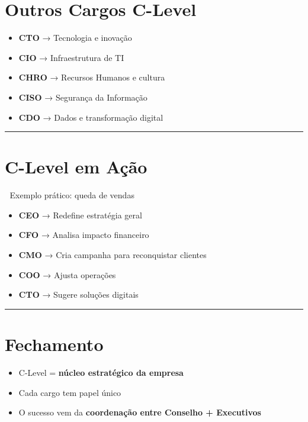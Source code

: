 \documentclass[
]{book}
\providecommand{\tightlist}{%
  \setlength{\itemsep}{0pt}\setlength{\parskip}{0pt}}
\begin{document}
\section{Outros Cargos C-Level}\label{outros-cargos-c-level}

\begin{itemize}
\tightlist
\item
  \textbf{CTO} → Tecnologia e inovação
\item
  \textbf{CIO} → Infraestrutura de TI
\item
  \textbf{CHRO} → Recursos Humanos e cultura
\item
  \textbf{CISO} → Segurança da Informação
\item
  \textbf{CDO} → Dados e transformação digital
\end{itemize}

\begin{center}\rule{0.5\linewidth}{0.5pt}\end{center}

\section{C-Level em Ação}\label{c-level-em-auxe7uxe3o}

📌 Exemplo prático: queda de vendas

\begin{itemize}
\tightlist
\item
  \textbf{CEO} → Redefine estratégia geral\\
\item
  \textbf{CFO} → Analisa impacto financeiro\\
\item
  \textbf{CMO} → Cria campanha para reconquistar clientes\\
\item
  \textbf{COO} → Ajusta operações\\
\item
  \textbf{CTO} → Sugere soluções digitais
\end{itemize}

\begin{center}\rule{0.5\linewidth}{0.5pt}\end{center}

\section{Fechamento}\label{fechamento}

\begin{itemize}
\tightlist
\item
  C-Level = \textbf{núcleo estratégico da empresa}\\
\item
  Cada cargo tem papel único\\
\item
  O sucesso vem da \textbf{coordenação entre Conselho + Executivos}
\end{itemize}
\end{document}
